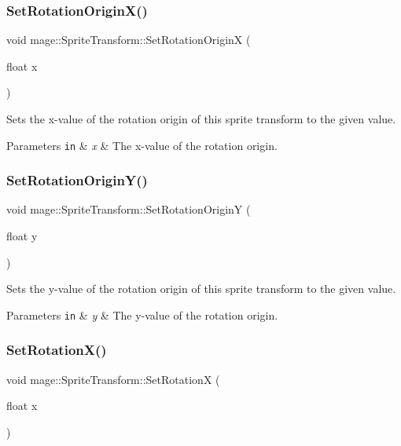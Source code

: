 \subsubsection{\texorpdfstring{Set\+Rotation\+Origin\+X()}{SetRotationOriginX()}}
{\footnotesize\ttfamily void mage\+::\+Sprite\+Transform\+::\+Set\+Rotation\+OriginX (\begin{DoxyParamCaption}\item[{float}]{x }\end{DoxyParamCaption})}

Sets the x-\/value of the rotation origin of this sprite transform to the given value.


\begin{DoxyParams}[1]{Parameters}
\mbox{\tt in}  & {\em x} & The x-\/value of the rotation origin. \\
\hline
\end{DoxyParams}
\hypertarget{structmage_1_1_sprite_transform_affd054e4f5602930b84a21b1637b657a}{}\label{structmage_1_1_sprite_transform_affd054e4f5602930b84a21b1637b657a} 
\subsubsection{\texorpdfstring{Set\+Rotation\+Origin\+Y()}{SetRotationOriginY()}}
{\footnotesize\ttfamily void mage\+::\+Sprite\+Transform\+::\+Set\+Rotation\+OriginY (\begin{DoxyParamCaption}\item[{float}]{y }\end{DoxyParamCaption})}

Sets the y-\/value of the rotation origin of this sprite transform to the given value.


\begin{DoxyParams}[1]{Parameters}
\mbox{\tt in}  & {\em y} & The y-\/value of the rotation origin. \\
\hline
\end{DoxyParams}
\hypertarget{structmage_1_1_sprite_transform_a0a1818532a11a000d3860542d0e1fabd}{}\label{structmage_1_1_sprite_transform_a0a1818532a11a000d3860542d0e1fabd} 
\subsubsection{\texorpdfstring{Set\+Rotation\+X()}{SetRotationX()}}
{\footnotesize\ttfamily void mage\+::\+Sprite\+Transform\+::\+Set\+RotationX (\begin{DoxyParamCaption}\item[{float}]{x }\end{DoxyParamCaption})}

